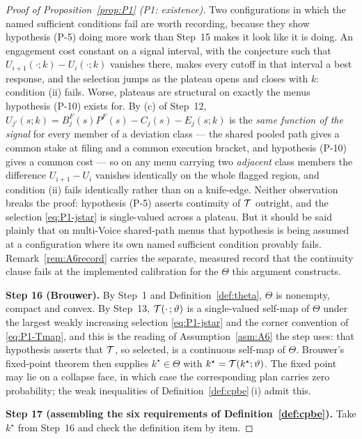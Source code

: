 \begin{proof}[Proof of Proposition~\ref{prop:P1} (P1: existence)]
Two configurations in which the named sufficient conditions fail are worth recording, because they
show hypothesis (P-5) doing more work than Step~15 makes it look like it is doing. An engagement cost
constant on a signal interval, with the conjecture such that $U_{i+1}(\cdot;k)-U_i(\cdot;k)$ vanishes
there, makes every cutoff in that interval a best response, and the selection jumps as the plateau
opens and closes with $k$: condition (ii) fails. Worse, plateaus are structural on exactly the menus
hypothesis (P-10) exists for. By (c) of Step~12,
$U_{j'}(s;k) = B_j^F(s)P^F(s)-C_j(s)-E_j(s;k)$ is the \emph{same function of the signal} for every
member of a deviation class --- the shared pooled path gives a common stake at filing and a common
execution bracket, and hypothesis (P-10) gives a common cost --- so on any menu carrying two
\emph{adjacent} class members the difference $U_{i+1}-U_i$ vanishes identically on the whole flagged
region, and condition (ii) fails identically rather than on a knife-edge. Neither observation breaks
the proof: hypothesis (P-5) asserts continuity of $\mathcal{T}$ outright, and the selection
\eqref{eq:P1-jstar} is single-valued across a plateau. But it should be said plainly that on
multi-Voice shared-path menus that hypothesis is being assumed at a configuration where its own named
sufficient condition provably fails. Remark~\ref{rem:A6record} carries the separate, measured record
that the continuity clause fails at the implemented calibration for the $\Theta$ this argument
constructs.

\smallskip
\noindent\textbf{Step 16 (Brouwer).}
By Step~1 and Definition~\ref{def:theta}, $\Theta$ is nonempty, compact and convex. By Step~13,
$\mathcal{T}(\cdot\,;\vartheta)$ is a single-valued self-map of $\Theta$ under the largest weakly
increasing selection \eqref{eq:P1-jstar} and the corner convention of \eqref{eq:P1-Tmap}, and this is
the reading of Assumption~\ref{asm:A6} the step uses: that hypothesis asserts that $\mathcal{T}$, so
selected, is a continuous self-map of $\Theta$. Brouwer's fixed-point theorem then supplies
$k^\star \in \Theta$ with $k^\star = \mathcal{T}(k^\star;\vartheta)$. The fixed point may lie on a collapse
face, in which case the corresponding plan carries zero probability; the weak inequalities of
Definition~\ref{def:cpbe}\,(i) admit this.

\smallskip
\noindent\textbf{Step 17 (assembling the six requirements of Definition~\ref{def:cpbe}).}
Take $k^\star$ from Step~16 and check the definition item by item.


\end{proof}
